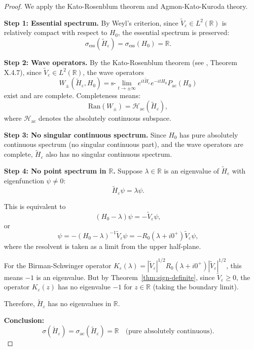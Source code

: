 ﻿\documentclass[12pt,a4paper]{article}
\theoremstyle{definition}
\theoremstyle{remark}
\begin{document}
\begin{proof}
We apply the Kato-Rosenblum theorem and Agmon-Kato-Kuroda theory.

\textbf{Step 1: Essential spectrum.}
By Weyl's criterion, since $\widetilde{V}_\varepsilon \in L^2(\mathbb{R})$ is relatively compact with respect to $H_0$, the essential spectrum is preserved:
\[
\sigma_{\text{ess}}(\widetilde{H}_\varepsilon) = \sigma_{\text{ess}}(H_0) = \mathbb{R}.
\]

\textbf{Step 2: Wave operators.}
By the Kato-Rosenblum theorem (see \cite{Kato1966PTLO}, Theorem X.4.7), since $\widetilde{V}_\varepsilon \in L^2(\mathbb{R})$, the wave operators
\[
W_\pm(\widetilde{H}_\varepsilon, H_0) = \text{s-}\lim_{t \to \pm\infty} e^{it\widetilde{H}_\varepsilon} e^{-itH_0} P_{\text{ac}}(H_0)
\]
exist and are complete. Completeness means:
\[
\text{Ran}(W_\pm) = \mathcal{H}_{\text{ac}}(\widetilde{H}_\varepsilon),
\]
where $\mathcal{H}_{\text{ac}}$ denotes the absolutely continuous subspace.

\textbf{Step 3: No singular continuous spectrum.}
Since $H_0$ has pure absolutely continuous spectrum (no singular continuous part), and the wave operators are complete, $\widetilde{H}_\varepsilon$ also has no singular continuous spectrum.

\textbf{Step 4: No point spectrum in $\mathbb{R}$.}
Suppose $\lambda \in \mathbb{R}$ is an eigenvalue of $\widetilde{H}_\varepsilon$ with eigenfunction $\psi \neq 0$:
\[
\widetilde{H}_\varepsilon \psi = \lambda \psi.
\]

This is equivalent to
\[
(H_0 - \lambda) \psi = -\widetilde{V}_\varepsilon \psi,
\]
or
\[
\psi = -(H_0 - \lambda)^{-1} \widetilde{V}_\varepsilon \psi = -R_0(\lambda + i0^+) \widetilde{V}_\varepsilon \psi,
\]
where the resolvent is taken as a limit from the upper half-plane.

For the Birman-Schwinger operator $K_\varepsilon(\lambda) = |\widetilde{V}_\varepsilon|^{1/2} R_0(\lambda + i0^+) |\widetilde{V}_\varepsilon|^{1/2}$, this means $-1$ is an eigenvalue. But by Theorem~\ref{thm:sign-definite}, since $\widetilde{V}_\varepsilon \geq 0$, the operator $K_\varepsilon(z)$ has no eigenvalue $-1$ for $z \in \mathbb{R}$ (taking the boundary limit).

Therefore, $\widetilde{H}_\varepsilon$ has no eigenvalues in $\mathbb{R}$.

\textbf{Conclusion:}
\[
\sigma(\widetilde{H}_\varepsilon) = \sigma_{\text{ac}}(\widetilde{H}_\varepsilon) = \mathbb{R} \quad \text{(pure absolutely continuous)}.
\]
\end{proof}
\end{document}
